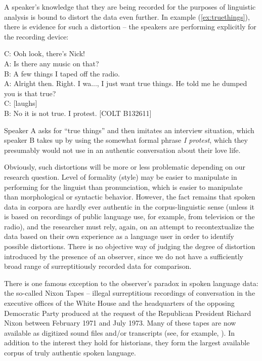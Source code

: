 A speaker's knowledge that they are being recorded for the purposes of linguistic analysis is bound to distort the data even further. In example (\ref{ex:truethings}), there is evidence for such a distortion -- the speakers are performing explicitly for the recording device:

\begin{exe}
\ex
\label{ex:truethings}
C: Ooh look, there's Nick! \\
A: Is there any music on that? \\
B: A few things I taped off the radio. \\
A: Alright then. Right. I wa..., I just want true things. He told me he dumped you is that true? \\
C: [laughs] \\
B: No it is not true. I protest. [COLT B132611]
\end{exe}

Speaker A asks for ``true things'' and then imitates an interview situation, which speaker B takes up by using the somewhat formal phrase \textit{I protest}, which they presumably would not use in an authentic  conversation  about their love life.

Obviously, such distortions will be more or less problematic depending on our research question. Level of formality (style)  may be easier to manipulate in performing for the linguist than pronunciation,  which is easier to manipulate than morphological or syntactic  behavior. However, the fact remains that spoken  data in corpora are hardly ever authentic  in the corpus\hyp{}linguistic sense (unless it is based on recordings of public language use, for example, from television or the radio), and the researcher must rely, again, on an attempt to recontextualize the data based on their own experience as a language user in order to identify possible distortions. There is no objective way of judging the degree of distortion introduced by the presence of an observer, since we do not have a sufficiently broad range of surreptitiously recorded data for comparison.

There is one famous exception to the observer's paradox in spoken  language data: the so\hyp{}called Nixon Tapes -- illegal surreptitious recordings of conversation  in the executive offices of the White House and the headquarters of the opposing Democratic Party produced at the request of the Republican President Richard Nixon between February 1971 and July 1973. Many of these tapes are now available as digitized sound files and\slash or transcripts  (see, for example, \citealt{nichter_nixon_2007}). In addition to the interest they hold for historians, they form the largest  available corpus of truly authentic  spoken  language.

